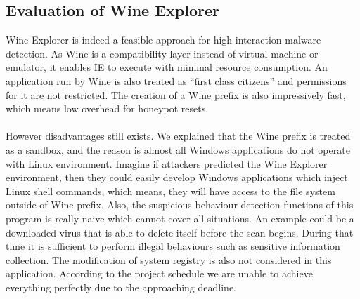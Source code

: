 \subsection{Evaluation of Wine Explorer}
Wine Explorer is indeed a feasible approach for high interaction malware 
detection. As Wine is a compatibility layer instead of virtual machine or 
emulator, it enables IE to execute with minimal resource consumption. 
An application run by Wine is also 
treated as ``first class citizens''\cite{wineperformance} and 
permissions for it are not 
restricted. The creation of a Wine prefix is also impressively fast, which 
means low overhead for honeypot resets. 
\paragraph{}
However disadvantages still exists. We explained that the Wine prefix is treated
as a sandbox, and the reason is almost all Windows applications do not operate 
with Linux environment. Imagine if attackers predicted the Wine Explorer 
environment, then they could easily develop Windows applications which inject 
Linux shell commands, which means, they will have access to the file system 
outside of Wine prefix. Also, the suspicious behaviour detection functions of 
this program is really naive which cannot cover all situations. An example 
could 
be a downloaded virus that is able to delete itself before the scan begins. 
During that time it is sufficient to perform illegal behaviours such as 
sensitive information collection. The modification of system 
registry is also not considered in this application. According to the project 
schedule we are unable to achieve everything perfectly due to the approaching 
deadline. 
